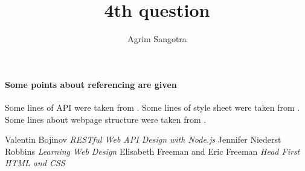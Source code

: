 \documentclass{article}
\title{4th question}
\author{Agrim Sangotra}
\date{}
\begin{document}
\maketitle

\paragraph{Some points about referencing are given}
Some lines of API were taken from \cite{api} .
Some lines of style sheet were taken from \cite{css} .
Some lines about webpage structure were taken from \cite{html} . \\

\begin{thebibliography}{}
Valentin Bojinov
\textit{RESTful Web API Design with Node.js}
Jennifer Niederst Robbins
\textit{Learning Web Design}
Elisabeth Freeman and Eric Freeman
\textit{Head First HTML and CSS}
\end{thebibliography}
\end{document}
